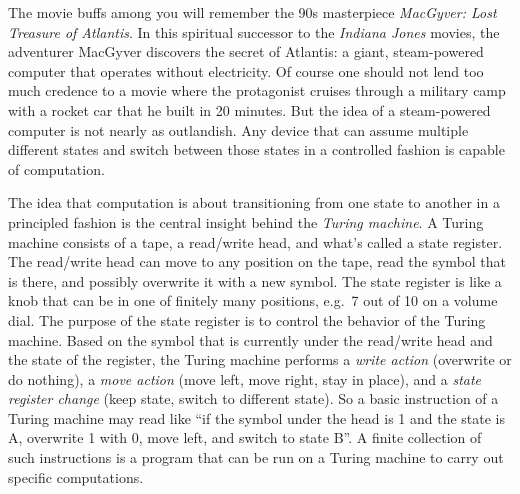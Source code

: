 The movie buffs among you will remember the 90s masterpiece \emph{MacGyver: Lost Treasure of Atlantis}.
In this spiritual successor to the \emph{Indiana Jones} movies, the adventurer MacGyver discovers the secret of Atlantis: a giant, steam-powered computer that operates without electricity.
Of course one should not lend too much credence to a movie where the protagonist cruises through a military camp with a rocket car that he built in 20 minutes.
But the idea of a steam-powered computer is not nearly as outlandish.
Any device that can assume multiple different states and switch between those states in a controlled fashion is capable of computation.

The idea that computation is about transitioning from one state to another in a principled fashion is the central insight behind the \emph{Turing machine}.
A Turing machine consists of a tape, a read/write head, and what's called a state register.
The read/write head can move to any position on the tape, read the symbol that is there, and possibly overwrite it with a new symbol.
The state register is like a knob that can be in one of finitely many positions, e.g.\ 7 out of 10 on a volume dial.
The purpose of the state register is to control the behavior of the Turing machine.
Based on the symbol that is currently under the read/write head and the state of the register, the Turing machine performs a \emph{write action} (overwrite or do nothing), a \emph{move action} (move left, move right, stay in place), and a \emph{state register change} (keep state, switch to different state).
So a basic instruction of a Turing machine may read like ``if the symbol under the head is 1 and the state is A, overwrite 1 with 0, move left, and switch to state B''.
A finite collection of such instructions is a program that can be run on a Turing machine to carry out specific computations.


